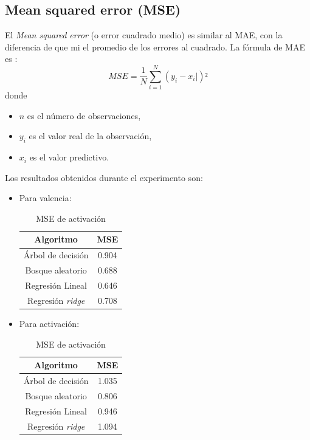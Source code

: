 \documentclass[12pt,a4paper,Spanish]{article}
\begin{document}
\subsection{Mean squared error (MSE)}
El \textit{Mean squared error} (o error cuadrado medio) es similar al MAE, con la diferencia de que mi el promedio de los errores al cuadrado. La fórmula de MAE es \cite{eswiki:159951880}:
\begin{equation}
	MSE = \frac{1}{N} \sum_{i=1}^{N} (y_i - x_i|)²
\end{equation}
donde
\begin{itemize}
	\item $n$ es el número de observaciones,
	\item $y_i$ es el valor real de la observación,
	\item $x_i$ es el valor predictivo.
\end{itemize}
Los resultados obtenidos durante el experimento son:
\begin{itemize}
	\item Para valencia:
	\begin{table}[H]
		\centering
		\caption{MSE de activación}
		\begin{tabular}{|c|c|}
			\hline
			\textbf{Algoritmo} & \textbf{MSE} \\
			\hline
			Árbol de decisión & 0.904 \\
			Bosque aleatorio & 0.688 \\
			Regresión Lineal & 0.646 \\
			Regresión \textit{ridge} & 0.708 \\
			\hline
		\end{tabular}
	\end{table}
	\item Para activación:
	\begin{table}[H]
		\centering
		\caption{MSE de activación}
		\begin{tabular}{|c|c|}
			\hline
			\textbf{Algoritmo} & \textbf{MSE} \\
			\hline
			Árbol de decisión & 1.035 \\
			Bosque aleatorio & 0.806 \\
			Regresión Lineal & 0.946 \\
			Regresión \textit{ridge} & 1.094 \\
			\hline
		\end{tabular}
	\end{table}
\end{itemize}
\end{document}
